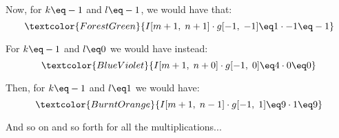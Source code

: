 \begin{example}
    Now, for $k \eq -1$ and $l \eq -1$, we would have that:
    \[ \textcolor{ForestGreen}{I[m + 1, \; n + 1] \cdot g[-1, \; -1] \eq 1 \cdot -1 \eq -1} \]

    For $k \eq -1$ and $l \eq 0$ we would have instead:
    \[ \textcolor{BlueViolet}{I[m + 1, \; n + 0] \cdot g[-1, \; 0] \eq 4 \cdot 0 \eq 0} \]

    Then, for $k \eq -1$ and $l \eq 1$ we would have:
    \[ \textcolor{BurntOrange}{I[m + 1, \; n - 1] \cdot g[-1, \; 1] \eq 9 \cdot 1 \eq 9} \]

    And so on and so forth for all the multiplications...
\end{example}